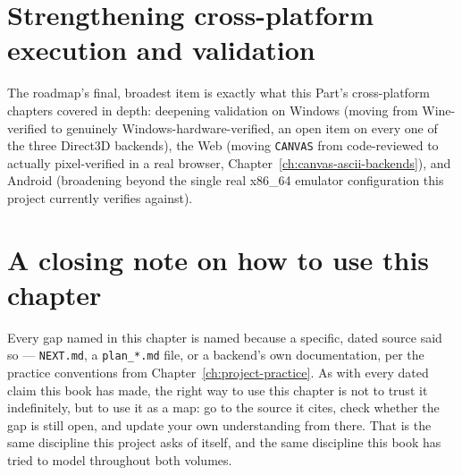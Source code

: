 \section{Strengthening cross-platform execution and validation}

The roadmap's final, broadest item is exactly what this Part's cross-platform chapters
covered in depth: deepening validation on Windows (moving from Wine-verified to genuinely
Windows-hardware-verified, an open item on every one of the three Direct3D backends), the
Web (moving \texttt{CANVAS} from code-reviewed to actually pixel-verified in a real browser,
Chapter~\ref{ch:canvas-ascii-backends}), and Android (broadening beyond the single real
x86\_64 emulator configuration this project currently verifies against).

\section{A closing note on how to use this chapter}

Every gap named in this chapter is named because a specific, dated source said so ---
\texttt{NEXT.md}, a \texttt{plan\_*.md} file, or a backend's own documentation, per the
practice conventions from Chapter~\ref{ch:project-practice}. As with every dated claim this
book has made, the right way to use this chapter is not to trust it indefinitely, but to use
it as a map: go to the source it cites, check whether the gap is still open, and update your
own understanding from there. That is the same discipline this project asks of itself, and
the same discipline this book has tried to model throughout both volumes.
